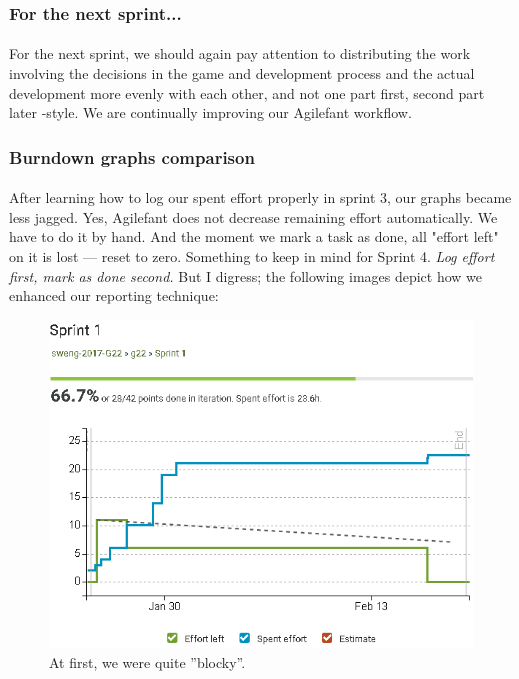 \subsubsection{For the next sprint...}

\paragraph{} For the next sprint, we should again pay attention to distributing the work involving the decisions in the game and development process and the actual development more evenly with each other, and not one part first, second part later -style. We are continually improving our Agilefant workflow.

\subsubsection{Burndown graphs comparison}

\paragraph{} After learning how to log our spent effort properly in sprint 3, our graphs became less jagged. Yes, Agilefant does not decrease remaining effort automatically. We have to do it by hand. And the moment we mark a task as done, all "effort left" on it is lost — reset to zero. Something to keep in mind for Sprint 4. \textit{Log effort first, mark as done second.} But I digress; the following images depict how we enhanced our reporting technique:

\begin{figure}[H]
\centering
\caption{At first, we were quite ''blocky''.} %
\includegraphics[width=\textwidth]{sprint1}
\end{figure}

